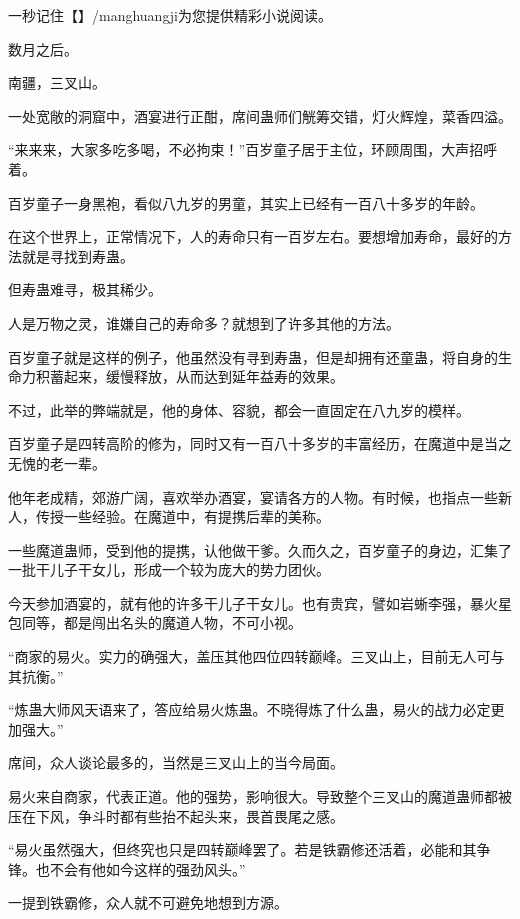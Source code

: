 
\begin{this_body}

一秒记住【】/manghuangji为您提供精彩小说阅读。

数月之后。

南疆，三叉山。

一处宽敞的洞窟中，酒宴进行正酣，席间蛊师们觥筹交错，灯火辉煌，菜香四溢。

“来来来，大家多吃多喝，不必拘束！”百岁童子居于主位，环顾周围，大声招呼着。

百岁童子一身黑袍，看似八九岁的男童，其实上已经有一百八十多岁的年龄。

在这个世界上，正常情况下，人的寿命只有一百岁左右。要想增加寿命，最好的方法就是寻找到寿蛊。

但寿蛊难寻，极其稀少。

人是万物之灵，谁嫌自己的寿命多？就想到了许多其他的方法。

百岁童子就是这样的例子，他虽然没有寻到寿蛊，但是却拥有还童蛊，将自身的生命力积蓄起来，缓慢释放，从而达到延年益寿的效果。

不过，此举的弊端就是，他的身体、容貌，都会一直固定在八九岁的模样。

百岁童子是四转高阶的修为，同时又有一百八十多岁的丰富经历，在魔道中是当之无愧的老一辈。

他年老成精，郊游广阔，喜欢举办酒宴，宴请各方的人物。有时候，也指点一些新人，传授一些经验。在魔道中，有提携后辈的美称。

一些魔道蛊师，受到他的提携，认他做干爹。久而久之，百岁童子的身边，汇集了一批干儿子干女儿，形成一个较为庞大的势力团伙。

今天参加酒宴的，就有他的许多干儿子干女儿。也有贵宾，譬如岩蜥李强，暴火星包同等，都是闯出名头的魔道人物，不可小视。

“商家的易火。实力的确强大，盖压其他四位四转巅峰。三叉山上，目前无人可与其抗衡。”

“炼蛊大师风天语来了，答应给易火炼蛊。不晓得炼了什么蛊，易火的战力必定更加强大。”

席间，众人谈论最多的，当然是三叉山上的当今局面。

易火来自商家，代表正道。他的强势，影响很大。导致整个三叉山的魔道蛊师都被压在下风，争斗时都有些抬不起头来，畏首畏尾之感。

“易火虽然强大，但终究也只是四转巅峰罢了。若是铁霸修还活着，必能和其争锋。也不会有他如今这样的强劲风头。”

一提到铁霸修，众人就不可避免地想到方源。


\end{this_body}
